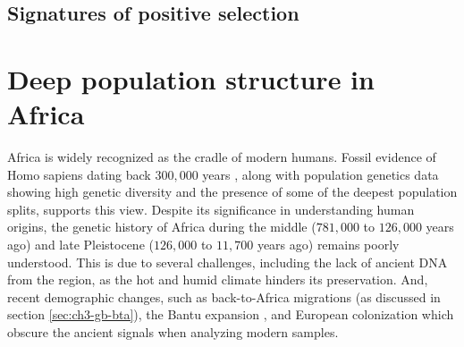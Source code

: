 
\subsection{Signatures of positive selection} 



\section{Deep population structure in Africa}
\label{sec:ch3-gb-deep}

Africa is widely recognized as the cradle of modern humans. 
%
Fossil evidence of Homo sapiens dating back $300{,}000$ years \cite{day1969early,hublin2017new}, along with population genetics data showing high genetic diversity and the presence of some of the deepest population splits, supports this view.
%
Despite its significance in understanding human origins, the genetic history of Africa during the middle ($781{,}000$ to $126{,}000$ years ago) and late Pleistocene ($126{,}000$ to $11{,}700$ years ago) remains poorly understood. 
%
This is due to several challenges, including the lack of ancient DNA from the region, as the hot and humid climate hinders its preservation. And, recent demographic changes, such as back-to-Africa migrations (as discussed in section \ref{sec:ch3-gb-bta}), the Bantu expansion \cite{tishkoff2009genetic}, and European colonization which obscure the ancient signals when analyzing modern samples.

